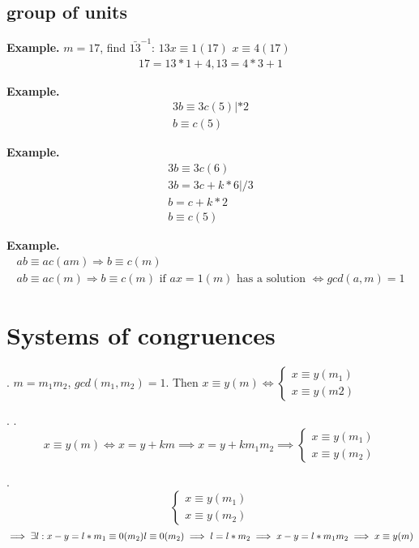 \subsection{group of units}

\textbf{Example.}
$ m = 17$, find $\bar{13}^{-1}$: $ 13 x \equiv 1 (17)$ $x \equiv 4 (17)$
\begin{align*}
  17 = 13 * 1 +4, 13 = 4*3 +1 
\end{align*}

\textbf{Example.}
\begin{align*}
  3b \equiv 3c (5) | *2 \\
  b \equiv c(5)
\end{align*}

\textbf{Example.}
\begin{align*}
  3b \equiv 3c (6) \\
  3b = 3c + k*6 | /3 \\
  b = c + k*2 \\
  b \equiv c(5)
\end{align*}

\textbf{Example.}
\begin{align*}
  ab \equiv ac (am) \Rightarrow b \equiv  c (m) \\
  ab \equiv ac (m) \Rightarrow b \equiv c (m)
    \text{ if } ax = 1 (m) \text{ has a solution } \iff gcd(a,m) = 1
\end{align*}

\section{Systems of congruences}

\Theorem.
$m = m_1 m_2$, $gcd(m_1, m_2) = 1$. Then $x \equiv y (m) \iff \begin{cases} x \equiv y (m_1) \\ x \equiv y (m2) \end{cases}$

\Proof.
\ProofForward.
\[
  x \equiv y (m) \iff x = y + km \implies x = y + k m_1 m_2 \implies
  \begin{cases}
    x \equiv y (m_1) \\
    x \equiv y (m_2) 
  \end{cases}
\]

\ProofBackward.
\[
  \begin{cases}
    x \equiv y (m_1) \\
    x \equiv y (m_2) 
  \end{cases}
\]
\[
  \implies \exists l: x-y = l* m_1 \equiv 0 (m_2)\\
  l \equiv 0 (m_2) \implies l = l * m_2 
    \implies x-y = l* m_1 m_2
    \implies x \equiv y (m)
\]

